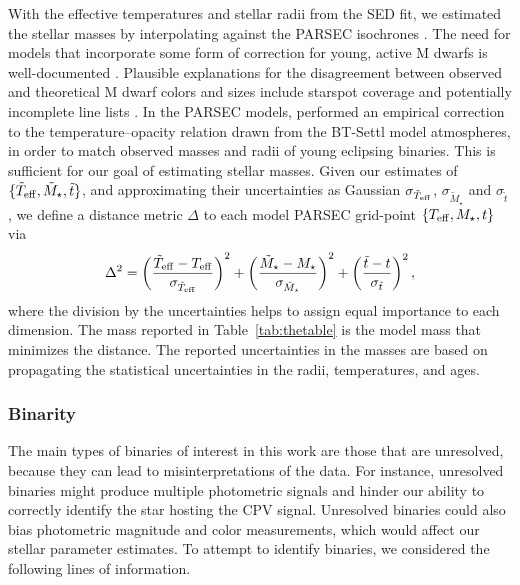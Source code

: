 \documentclass[11pt,twocolumn,tighten]{aastex63}
\begin{document}
With the effective temperatures and stellar radii from the SED fit, we
estimated the stellar masses by interpolating against the PARSEC
isochrones \citep[v1.2S][]{2014MNRAS.444.2525C}.  The need for models
that incorporate some form of correction for young, active M dwarfs is
well-documented
\citep[e.g.][]{2012ApJ...756...47S,2015ApJ...804..146D,2016A&A...593A..99F,2020ApJ...891...29S}.
Plausible explanations for the disagreement between observed and
theoretical M dwarf colors and sizes include starspot coverage
\citep[e.g.][]{2017ApJ...836..200G} and potentially incomplete line
lists \citep[e.g.][]{2013A&A...556A..15R}.  In the PARSEC models,
\citet{2014MNRAS.444.2525C} performed an empirical correction to the
temperature--opacity relation drawn from the BT-Settl model
atmospheres, in order to match observed masses and radii of young
eclipsing binaries.  This is sufficient for our goal of estimating
stellar masses.  Given our estimates of $\{ \tilde{T}_{\rm eff},
\tilde{M}_\star, \tilde{t} \}$, and approximating their uncertainties
as Gaussian $\sigma_{\tilde{T}_{\rm eff}}$, $\sigma_{\tilde{M}_\star}$
and $\sigma_{\tilde{t}}$, we define a distance metric $\Delta$ to each
model PARSEC grid-point $\{ T_{\rm eff}, M_\star, t \}$ via
\begin{equation}
  \Delta^2 = 
  \left( \frac{\tilde{T}_{\rm eff} - T_{\rm eff}}{\sigma_{\tilde{T}_{\rm eff}}} \right)^2
  +
  \left( \frac{\tilde{M}_{\star} - M_{\star}}{\sigma_{\tilde{M}_{\star}}} \right)^2
  +
  \left( \frac{\tilde{t} - t}{\sigma_{\tilde{t}}} \right)^2,
\end{equation}
where the division by the uncertainties helps to assign equal
importance to each dimension.  The mass reported in
Table~\ref{tab:thetable} is the model mass that minimizes the
distance.  The reported uncertainties in the masses are based on
propagating the statistical uncertainties in the radii, temperatures,
and ages.


\subsubsection{Binarity}

The main types of binaries of interest in this work are those that are
unresolved, because they can lead to misinterpretations of the data.
For instance, unresolved binaries might produce multiple photometric
signals and hinder our ability to correctly identify the star hosting
the CPV signal.  Unresolved binaries could also bias photometric
magnitude and color measurements, which would affect our stellar
parameter estimates.  To attempt to identify binaries, we considered
the following lines of information.
\end{document}

